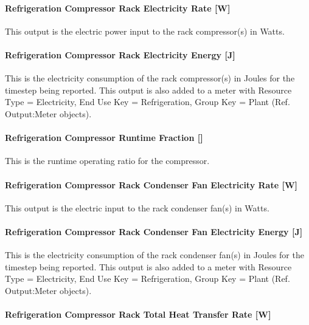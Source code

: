 \paragraph{Refrigeration Compressor Rack Electricity Rate {[}W{]}}\label{refrigeration-compressor-rack-electric-power-w}

This output is the electric power input to the rack compressor(s) in Watts.

\paragraph{Refrigeration Compressor Rack Electricity Energy {[}J{]}}\label{refrigeration-compressor-rack-electric-energy-j}

This is the electricity consumption of the rack compressor(s) in Joules for the timestep being reported. This output is also added to a meter with Resource Type = Electricity, End Use Key = Refrigeration, Group Key = Plant (Ref. Output:Meter objects).

\paragraph{Refrigeration Compressor Runtime Fraction {[]}}\label{refrigeration-compressor-runtime-fraction}

This is the runtime operating ratio for the compressor.

\paragraph{Refrigeration Compressor Rack Condenser Fan Electricity Rate {[}W{]}}\label{refrigeration-compressor-rack-condenser-fan-electric-power-w}

This output is the electric input to the rack condenser fan(s) in Watts.

\paragraph{Refrigeration Compressor Rack Condenser Fan Electricity Energy {[}J{]}}\label{refrigeration-compressor-rack-condenser-fan-electric-energy-j}

This is the electricity consumption of the rack condenser fan(s) in Joules for the timestep being reported. This output is also added to a meter with Resource Type = Electricity, End Use Key = Refrigeration, Group Key = Plant (Ref. Output:Meter objects).

\paragraph{Refrigeration Compressor Rack Total Heat Transfer Rate {[}W{]}}\label{refrigeration-compressor-rack-total-heat-transfer-rate-w}

